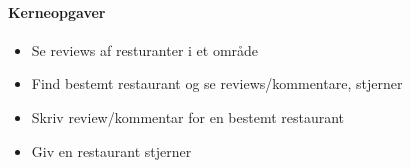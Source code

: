 \documentclass[a4paper, 12pt]{article}
\begin{document}
\paragraph{Kerneopgaver}
\begin{itemize}
\item Se reviews af resturanter i et område
\item Find bestemt restaurant og se reviews/kommentare, stjerner
\item Skriv review/kommentar for en bestemt restaurant
\item Giv en restaurant stjerner
\end{itemize}

\clearpage
\appendix

\printbibliography[heading=bibnumbered,title=Litteraturliste]
\end{document}
